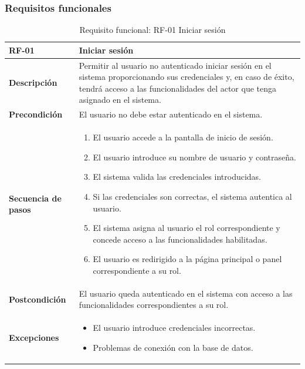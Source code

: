 \subsubsection {Requisitos funcionales}
\label{subsubsec:requisitos_funcionales}
\begin{table}[H]
\centering
\begin{tabularx}{\textwidth}{
  |>{\centering\arraybackslash}l
  |>{\centering\arraybackslash}X|}
\hline

\textbf{RF-01} & \textbf{Iniciar sesión} \\ \hline

\textbf{Descripción} & Permitir al usuario no autenticado iniciar sesión en el sistema proporcionando sus credenciales y, en caso de éxito, tendrá acceso a las funcionalidades del actor que tenga asignado en el sistema. \\ \hline

\textbf{Precondición} & El usuario no debe estar autenticado en el sistema. \\ \hline

\textbf{Secuencia de pasos} & 
\begin{enumerate}
  \item El usuario accede a la pantalla de inicio de sesión.
  \item El usuario introduce su nombre de usuario y contraseña.
  \item El sistema valida las credenciales introducidas.
  \item Si las credenciales son correctas, el sistema autentica al usuario.
  \item El sistema asigna al usuario el rol correspondiente y concede acceso a las funcionalidades habilitadas.
  \item El usuario es redirigido a la página principal o panel correspondiente a su rol.
\end{enumerate} \\ \hline

\textbf{Postcondición} & El usuario queda autenticado en el sistema con acceso a las funcionalidades correspondientes a su rol. \\ \hline

\textbf{Excepciones} & 
\begin{itemize}
  \item El usuario introduce credenciales incorrectas.
  \item Problemas de conexión con la base de datos.
\end{itemize} \\ \hline
\end{tabularx}
\caption{Requisito funcional: RF-01 Iniciar sesión}
\end{table}
